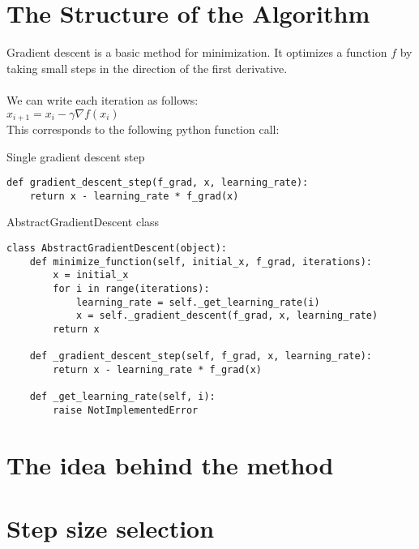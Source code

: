 \documentclass{article}
\begin{document}

\section{The Structure of the Algorithm}

Gradient descent is a basic method for minimization. It optimizes a function $f$
by taking small steps in the direction of the first derivative. \\
\\
We can write each iteration as follows:\\
$x_{i+1} = x_i - \gamma \nabla f(x_i) $ \\
This corresponds to the following python function call:
\begin{algorithm}\caption{Single gradient descent step}\begin{lstlisting}
def gradient_descent_step(f_grad, x, learning_rate):
    return x - learning_rate * f_grad(x)
\end{lstlisting}\end{algorithm}
\begin{algorithm}\caption{AbstractGradientDescent class}\begin{lstlisting}
class AbstractGradientDescent(object):
    def minimize_function(self, initial_x, f_grad, iterations):
        x = initial_x
        for i in range(iterations):
            learning_rate = self._get_learning_rate(i)
            x = self._gradient_descent(f_grad, x, learning_rate)
        return x

    def _gradient_descent_step(self, f_grad, x, learning_rate):
        return x - learning_rate * f_grad(x)

    def _get_learning_rate(self, i):
        raise NotImplementedError
\end{lstlisting}\end{algorithm}
\section{The idea behind the method}

\section{Step size selection}
\end{document}
